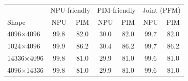 \begin{tabular}{lcccccc}
\toprule
 & \multicolumn{2}{c}{NPU-friendly} & \multicolumn{2}{c}{PIM-friendly} & \multicolumn{2}{c}{Joint (PFM)} \\
Shape & NPU & PIM & NPU & PIM & NPU & PIM \\
\midrule
4096$\times$4096 & 99.8 & 82.0 & 30.0 & 82.0 & 99.7 & 82.0 \\
1024$\times$4096 & 99.9 & 86.2 & 30.4 & 86.2 & 99.7 & 86.2 \\
14336$\times$4096 & 99.8 & 81.0 & 29.9 & 81.0 & 99.6 & 81.0 \\
4096$\times$14336 & 99.8 & 81.0 & 29.9 & 81.0 & 99.6 & 81.0 \\
\bottomrule
\end{tabular}
